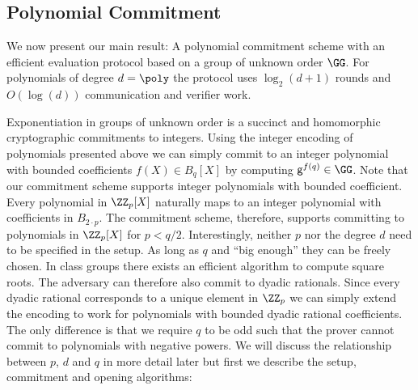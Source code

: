 \documentclass{article}
\theoremstyle{definition}
\begin{document}
\subsection{Polynomial Commitment}

We now present our main result: 
A polynomial commitment scheme with an efficient evaluation protocol based on a group of unknown order $\GG$. For polynomials of degree $d=\poly$ the protocol uses $\log_2(d+1)$ rounds and $O(\log(d))$ communication and verifier work.

Exponentiation in groups of unknown order is a succinct and homomorphic cryptographic commitments to integers.
Using the integer encoding of polynomials presented above we can simply commit to an integer polynomial with bounded coefficients $f(X)\in B_{q}[X]$ by computing $\gr{g}^{f(q)} \in \GG$. Note that our commitment scheme supports integer polynomials with bounded coefficient. Every polynomial in $\ZZ_p[X]$ naturally maps to an integer polynomial with coefficients in $B_{2\cdot p}$. The commitment scheme, therefore, supports committing to polynomials in $\ZZ_p[X]$ for $p<q/2$. Interestingly, neither $p$ nor the degree $d$ need to be specified in the setup. As long as $q$ and ``big enough'' they can be freely chosen. In class groups there exists an efficient algorithm to compute square roots. The adversary can therefore also commit to dyadic rationals. Since every dyadic rational corresponds to a unique element in $\ZZ_p$ we can simply extend the encoding to work for polynomials with bounded dyadic rational coefficients. The only difference is that we require $q$ to be odd such that the prover cannot commit to polynomials with negative powers. We will discuss the relationship between $p$, $d$ and $q$ in more detail later but first we describe the setup, commitment and opening algorithms:
\end{document}
